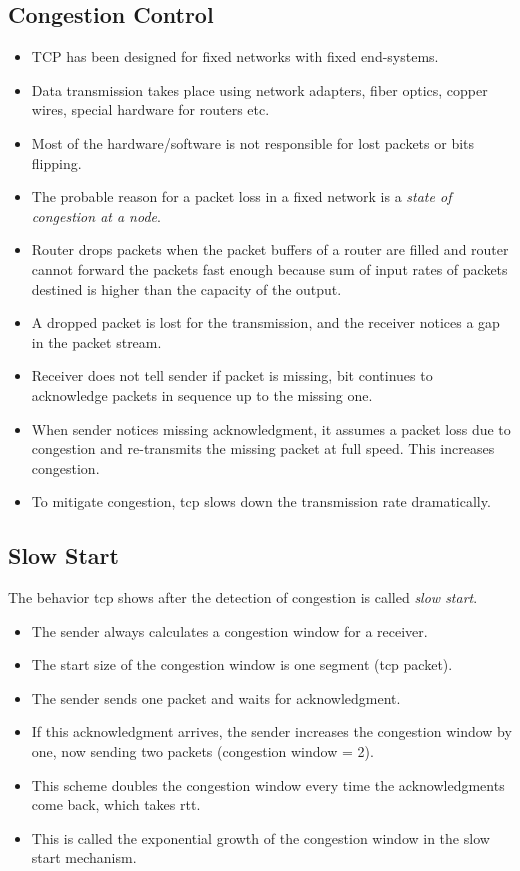 \subsection{Congestion Control}

\begin{itemize}
	\item TCP has been designed for fixed networks with fixed end-systems.
	\item Data transmission takes place using network adapters, fiber optics, copper wires, special hardware for routers etc.
	\item Most of the hardware/software is not responsible for lost packets or bits flipping.
	\item The probable reason for a packet loss in a fixed network is a \textit{state of congestion at a node}.
	\item Router drops packets when the packet buffers of a router are filled and router cannot forward the packets fast enough because sum of input rates of packets destined is higher than the capacity of the output.
	\item A dropped packet is lost for the transmission, and the receiver notices a gap in the packet stream.
	\item Receiver does not tell sender if packet is missing, bit continues to acknowledge packets in sequence up to the missing one.
	\item When sender notices missing acknowledgment, it assumes a packet loss due to congestion and re-transmits the missing packet at full speed. This increases congestion.
	\item To mitigate congestion, \gls{tcp} slows down the transmission rate dramatically. 
\end{itemize}

\subsection{Slow Start}
The behavior \gls{tcp} shows after the detection of congestion is called \textit{slow start}.

\begin{itemize}
	\item The sender always calculates a congestion window for a receiver. 
	\item The start size of the congestion window is one segment (\gls{tcp} packet). 
	\item The sender sends one packet and waits for acknowledgment. 
	\item If this acknowledgment arrives, the sender increases the congestion window by one, now sending two packets (congestion window = 2). 
	\item This scheme doubles the congestion window every time the acknowledgments come back, which
	takes \gls{rtt}. 
	\item This is called the exponential growth of the congestion window in the slow start mechanism.
\end{itemize}


